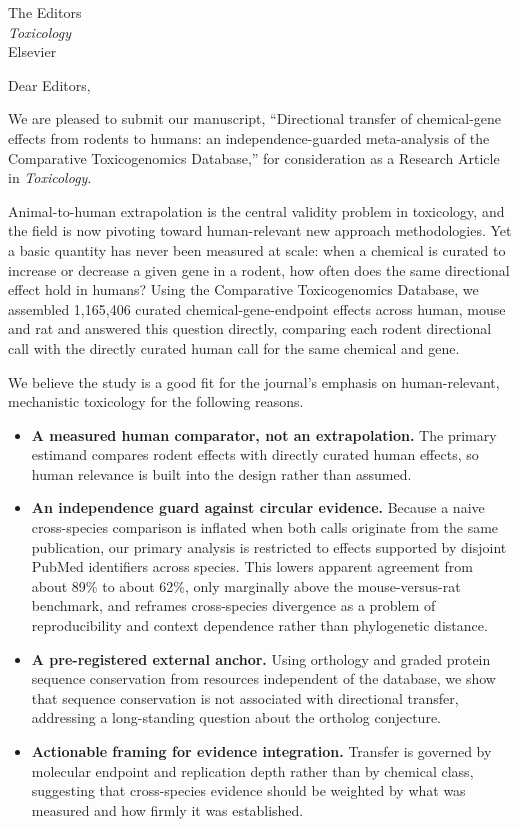 \documentclass[11pt]{letter}
\begin{document}
\begin{letter}{The Editors \\ \textit{Toxicology} \\ Elsevier}

\opening{Dear Editors,}

We are pleased to submit our manuscript, ``Directional transfer of
chemical-gene effects from rodents to humans: an independence-guarded
meta-analysis of the Comparative Toxicogenomics Database,'' for consideration as
a Research Article in \textit{Toxicology}.

Animal-to-human extrapolation is the central validity problem in toxicology, and
the field is now pivoting toward human-relevant new approach methodologies. Yet
a basic quantity has never been measured at scale: when a chemical is curated to
increase or decrease a given gene in a rodent, how often does the same
directional effect hold in humans? Using the Comparative Toxicogenomics
Database, we assembled 1{,}165{,}406 curated chemical-gene-endpoint effects
across human, mouse and rat and answered this question directly, comparing each
rodent directional call with the directly curated human call for the same
chemical and gene.

We believe the study is a good fit for the journal's emphasis on human-relevant,
mechanistic toxicology for the following reasons.

\begin{itemize}
\item \textbf{A measured human comparator, not an extrapolation.} The primary
estimand compares rodent effects with directly curated human effects, so human
relevance is built into the design rather than assumed.
\item \textbf{An independence guard against circular evidence.} Because a naive
cross-species comparison is inflated when both calls originate from the same
publication, our primary analysis is restricted to effects supported by disjoint
PubMed identifiers across species. This lowers apparent agreement from about
89\% to about 62\%, only marginally above the mouse-versus-rat benchmark, and
reframes cross-species divergence as a problem of reproducibility and context
dependence rather than phylogenetic distance.
\item \textbf{A pre-registered external anchor.} Using orthology and graded
protein sequence conservation from resources independent of the database, we
show that sequence conservation is not associated with directional transfer,
addressing a long-standing question about the ortholog conjecture.
\item \textbf{Actionable framing for evidence integration.} Transfer is governed
by molecular endpoint and replication depth rather than by chemical class,
suggesting that cross-species evidence should be weighted by what was measured
and how firmly it was established.
\end{itemize}


\end{letter}
\end{document}
